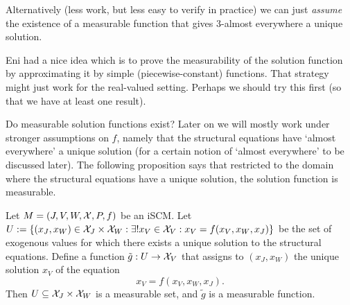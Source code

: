 {  Alternatively (less work, but less easy to verify in practice) we can just \emph{assume} the existence of a 
  measurable function that gives 3-almost everywhere a unique solution.

  Eni had a nice idea which is to prove the measurability of the solution function by approximating it
  by simple (piecewise-constant) functions. That strategy might just work for the real-valued setting.
  Perhaps we should try this first (so that we have at least one result).
}

Do measurable solution functions exist?
Later on we will mostly work under stronger assumptions on $f$, namely that the 
structural equations have `almost everywhere' a unique solution (for a certain 
notion of `almost everywhere' to be discussed later).
The following proposition says that restricted to the domain where the structural
equations have a unique solution, the solution function is measurable.
\begin{Prp}
  Let $M = \left ( J, V, W, \mathcal{X}, P, f \right )$ be an iSCM.
  Let $U := \{ (x_J,x_W) \in \mathcal{X}_J \times \mathcal{X}_W : \exists ! x_V \in \mathcal{X}_V : x_V = f(x_V,x_W,x_J) \}$
  be the set of exogenous values for which there exists a unique solution to the structural equations.
  Define a function $\tilde{g} : U \to \mathcal{X}_V$ that assigns to $(x_J,x_W)$ the unique solution $x_V$ of the
  equation
  $$x_V = f(x_V,x_W,x_J).$$
  Then $U \subseteq \mathcal{X}_J \times \mathcal{X}_W$ is a measurable set, and $\tilde{g}$ is a measurable function.
\end{Prp}
